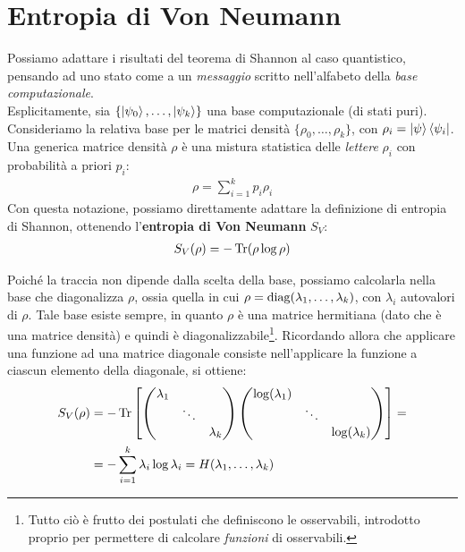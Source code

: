 \documentclass[../../InformazioneQuantistica.tex]{subfiles}
\begin{document}
\section{Entropia di Von Neumann}
Possiamo adattare i risultati del teorema di Shannon al caso quantistico, pensando ad uno stato come a un \textit{messaggio} scritto nell'alfabeto della \textit{base computazionale}.\\
Esplicitamente, sia $\{\Ket{\psi_0}, \dots, \Ket{\psi_k}\}$ una base computazionale (di stati puri). Consideriamo la relativa base per le matrici densità $\{\rho_0, \dots, \rho_k\}$, con $\rho_i = \Ket{\psi}\Bra{\psi_i}$. Una generica matrice densità $\rho$ è una mistura statistica delle \textit{lettere} $\rho_i$ con probabilità a priori $p_i$:
\begin{align*}
\rho = \sum_{i=1}^k p_i \rho_i
\end{align*} 
Con questa notazione, possiamo direttamente adattare la definizione di entropia di Shannon, ottenendo l'\textbf{entropia di Von Neumann} $S_V$:
\begin{align*}
S_V(\rho) = -\operatorname{Tr}(\rho \log \rho)
\end{align*}

Poiché la traccia non dipende dalla scelta della base, possiamo calcolarla nella base che diagonalizza $\rho$, ossia quella in cui $\rho = \operatorname{diag}(\lambda_1, \dots, \lambda_k)$, con $\lambda_i$ autovalori di $\rho$. Tale base esiste sempre, in quanto $\rho$ è una matrice hermitiana (dato che è una matrice densità) e quindi è diagonalizzabile\footnote{Tutto ciò è frutto dei postulati che definiscono le osservabili, introdotto proprio per permettere di calcolare \textit{funzioni} di osservabili.}. Ricordando allora che applicare una funzione ad una matrice diagonale consiste nell'applicare la funzione a ciascun elemento della diagonale, si ottiene:
\begin{align*}
    S_V(\rho) &= -\operatorname{Tr}\left[\begin{pmatrix}
    \lambda_1 & & \\
    & \ddots &\\
    & & \lambda_k
    \end{pmatrix} \begin{pmatrix}
    \log(\lambda_1) & &\\
    & \ddots &\\
    & & \log(\lambda_k)
    \end{pmatrix}\right] = \\
    &= -\sum_{i=1}^k \lambda_i \log \lambda_i = H(\lambda_1, \dots, \lambda_k)
\end{align*}
\end{document}
